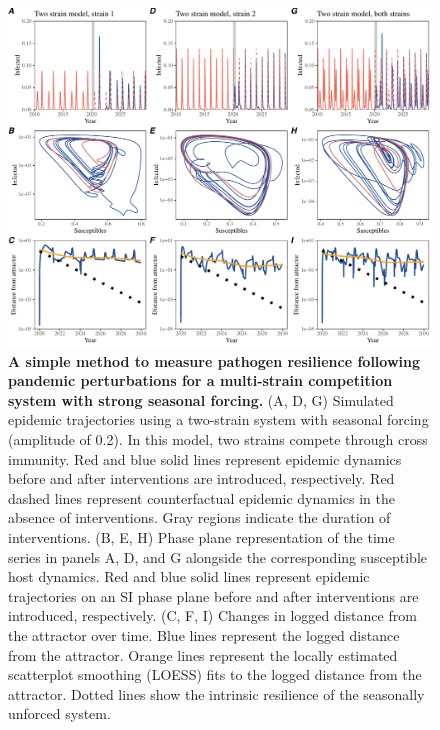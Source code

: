 \documentclass[12pt]{article}
\begin{document}
\begin{figure}[!th]
\includegraphics[width=\textwidth]{../figure2/figure2_multi_strong.pdf}
\caption{
\textbf{A simple method to measure pathogen resilience following pandemic perturbations for a multi-strain competition system with strong seasonal forcing.}
(A, D, G) Simulated epidemic trajectories using a two-strain system with seasonal forcing (amplitude of 0.2).
In this model, two strains compete through cross immunity.
Red and blue solid lines represent epidemic dynamics before and after interventions are introduced, respectively.
Red dashed lines represent counterfactual epidemic dynamics in the absence of interventions.
Gray regions indicate the duration of interventions.
(B, E, H) Phase plane representation of the time series in panels A, D, and G alongside the corresponding susceptible host dynamics.
Red and blue solid lines represent epidemic trajectories on an SI phase plane before and after interventions are introduced, respectively.
(C, F, I) Changes in logged distance from the attractor over time.
Blue lines represent the logged distance from the attractor.
Orange lines represent the locally estimated scatterplot smoothing (LOESS) fits to the logged distance from the attractor.
Dotted lines show the intrinsic resilience of the seasonally unforced system.
}
\end{figure}

\pagebreak
\end{document}
